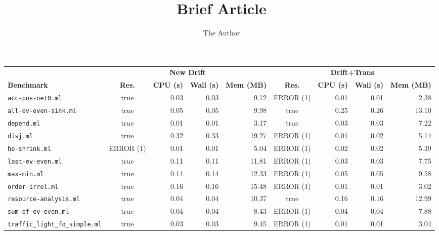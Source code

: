 \documentclass[11pt, oneside]{article}   	%
\title{Brief Article}
\author{The Author}
\begin{document}
\maketitle
\footnotesize
\hspace{-1.5in}
\begin{tabular}{|l|c|rrr|c|rrr|}
\hline
                & \multicolumn{4}{c|}{\bf New Drift} & \multicolumn{4}{c|}{\bf Drift+Trans} \\
{\bf Benchmark} & {\bf Res.} & {\bf CPU (s)} & {\bf Wall (s)} & {\bf Mem (MB)} & {\bf Res.} & {\bf CPU (s)} & {\bf Wall (s)} & {\bf Mem (MB)} \\
\hline
\hline
\texttt{acc-pos-net0.ml}     & true     & 0.03 & 0.03 & 9.72 & ERROR (1) & 0.01 & 0.01 & 2.38 \\
\hline
\texttt{all-ev-even-sink.ml} & true     & 0.05 & 0.05 & 9.98 & true     & 0.25 & 0.26 & 13.10 \\
\hline
\texttt{depend.ml}           & true     & 0.01 & 0.01 & 3.17 & true     & 0.03 & 0.03 & 7.22 \\
\hline
\texttt{disj.ml}             & true     & 0.32 & 0.33 & 19.27 & ERROR (1) & 0.01 & 0.02 & 5.14 \\
\hline
\texttt{ho-shrink.ml}        & ERROR (1) & 0.01 & 0.01 & 5.04 & ERROR (1) & 0.02 & 0.02 & 5.39 \\
\hline
\texttt{last-ev-even.ml}     & true     & 0.11 & 0.11 & 11.81 & ERROR (1) & 0.03 & 0.03 & 7.75 \\
\hline
\texttt{max-min.ml}          & true     & 0.14 & 0.14 & 12.33 & ERROR (1) & 0.05 & 0.05 & 9.58 \\
\hline
\texttt{order-irrel.ml}      & true     & 0.16 & 0.16 & 15.48 & ERROR (1) & 0.01 & 0.01 & 3.02 \\
\hline
\texttt{resource-analysis.ml} & true     & 0.04 & 0.04 & 10.37 & true     & 0.16 & 0.16 & 12.99 \\
\hline
\texttt{sum-of-ev-even.ml}   & true     & 0.04 & 0.04 & 8.43 & ERROR (1) & 0.04 & 0.04 & 7.88 \\
\hline
\texttt{traffic\_light\_fo\_simple.ml} & true     & 0.03 & 0.03 & 9.45 & ERROR (1) & 0.01 & 0.01 & 3.04 \\
\hline
\end{tabular}
\end{document}
